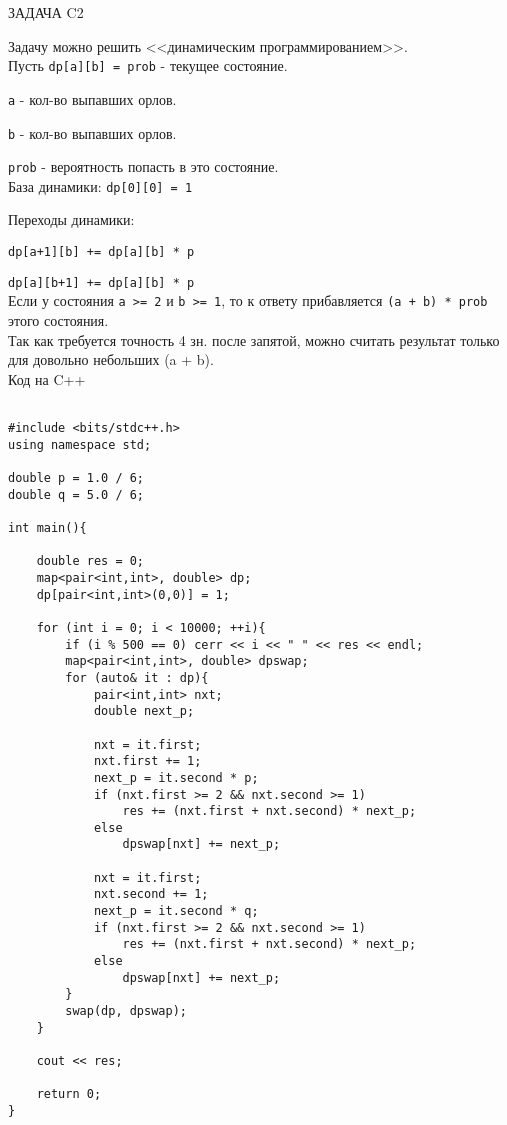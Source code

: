 \documentclass[a4paper,12pt,preview]{report} %
\begin{document}
	\begin{center}
		\Huge ЗАДАЧА C2
	\end{center}
	
	Задачу можно решить <<динамическим программированием>>.\\
	
	Пусть \texttt{dp[a][b] = prob} - текущее состояние.
	
	\texttt{a} - кол-во выпавших орлов.
	
	\texttt{b} - кол-во выпавших орлов.
	
	\texttt{prob} - вероятность попасть в это состояние. \\
	
	База динамики: \texttt{dp[0][0] = 1}
	
	Переходы динамики:
	
	\texttt{dp[a+1][b] += dp[a][b] * p}
	
	
	\texttt{dp[a][b+1] += dp[a][b] * p} \\
	
	Если у состояния \texttt{a >= 2} и \texttt{b >= 1}, то к ответу прибавляется \texttt{(a + b) * prob } этого состояния. \\
	
	Так как требуется точность 4 зн. после запятой, можно считать результат только для довольно небольших (a + b). \\
	
	Код на C++
	
	\begin{lstlisting}
	
#include <bits/stdc++.h>
using namespace std;

double p = 1.0 / 6;
double q = 5.0 / 6;

int main(){

    double res = 0;
    map<pair<int,int>, double> dp;
    dp[pair<int,int>(0,0)] = 1;
    
    for (int i = 0; i < 10000; ++i){
        if (i % 500 == 0) cerr << i << " " << res << endl;
        map<pair<int,int>, double> dpswap;
        for (auto& it : dp){
            pair<int,int> nxt;
            double next_p;

            nxt = it.first;
            nxt.first += 1;
            next_p = it.second * p;
            if (nxt.first >= 2 && nxt.second >= 1) 
                res += (nxt.first + nxt.second) * next_p;
            else
                dpswap[nxt] += next_p;

            nxt = it.first;
            nxt.second += 1;
            next_p = it.second * q;
            if (nxt.first >= 2 && nxt.second >= 1)
                res += (nxt.first + nxt.second) * next_p;
            else
                dpswap[nxt] += next_p;
        }
        swap(dp, dpswap);
    }

    cout << res;

    return 0;
}

	
	\end{lstlisting}
	
\end{document}
